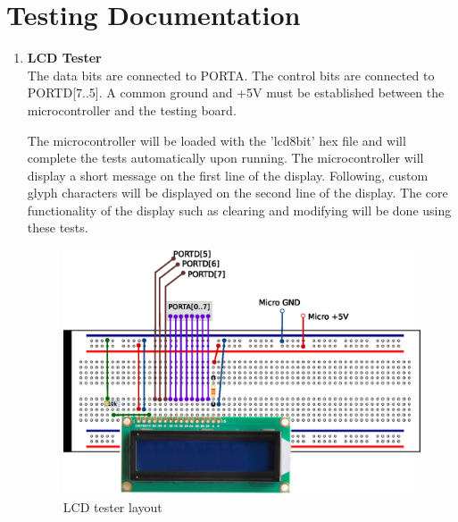 \documentclass[bibtotocnumbered,abstract=on,paper=a4,fontsize=12pt,parskip=on,halfparskip=on]{scrartcl}		%
\begin{document}
\section{Testing Documentation}
      \label{sec:testing-documentation}
  \begin{enumerate}
    \item{\textbf{LCD Tester}}\hfill \\
    The data bits are connected to PORTA. The control bits are connected to PORTD[7..5]. A common ground and +5V must be established between the microcontroller and the testing board.\par

      The microcontroller will be loaded with the 'lcd8bit' hex file and will complete the tests automatically upon running. The microcontroller will display a short message on the first line of the display. Following, custom glyph characters will be displayed on the second line of the display. The core functionality of the display such as clearing and modifying will be done using these tests.
  \begin{figure}[H]
    \centering
      \includegraphics[width=\linewidth]{img/testdoc_lcdtester}
      \caption{LCD tester layout}
  \end{figure}


\end{enumerate}
\end{document}
